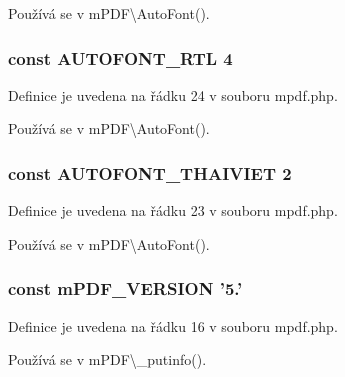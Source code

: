 Používá se v m\-P\-D\-F\textbackslash{}\-Auto\-Font().

\hypertarget{mpdf_8php_adf1bd08e567f41674b63d1ad2bc6c031}{
\subsubsection[{A\-U\-T\-O\-F\-O\-N\-T\-\_\-\-R\-T\-L}]{\setlength{\rightskip}{0pt plus 5cm}const A\-U\-T\-O\-F\-O\-N\-T\-\_\-\-R\-T\-L 4}}\label{mpdf_8php_adf1bd08e567f41674b63d1ad2bc6c031}


Definice je uvedena na řádku 24 v souboru mpdf.\-php.



Používá se v m\-P\-D\-F\textbackslash{}\-Auto\-Font().

\hypertarget{mpdf_8php_aa2ebc1164b8aefa9886f0824e66cc49a}{
\subsubsection[{A\-U\-T\-O\-F\-O\-N\-T\-\_\-\-T\-H\-A\-I\-V\-I\-E\-T}]{\setlength{\rightskip}{0pt plus 5cm}const A\-U\-T\-O\-F\-O\-N\-T\-\_\-\-T\-H\-A\-I\-V\-I\-E\-T 2}}\label{mpdf_8php_aa2ebc1164b8aefa9886f0824e66cc49a}


Definice je uvedena na řádku 23 v souboru mpdf.\-php.



Používá se v m\-P\-D\-F\textbackslash{}\-Auto\-Font().

\hypertarget{mpdf_8php_a3e7086f113971110fee51c826d97c58c}{
\subsubsection[{m\-P\-D\-F\-\_\-\-V\-E\-R\-S\-I\-O\-N}]{\setlength{\rightskip}{0pt plus 5cm}const m\-P\-D\-F\-\_\-\-V\-E\-R\-S\-I\-O\-N '5.'}}\label{mpdf_8php_a3e7086f113971110fee51c826d97c58c}


Definice je uvedena na řádku 16 v souboru mpdf.\-php.



Používá se v m\-P\-D\-F\textbackslash{}\-\_\-putinfo().

